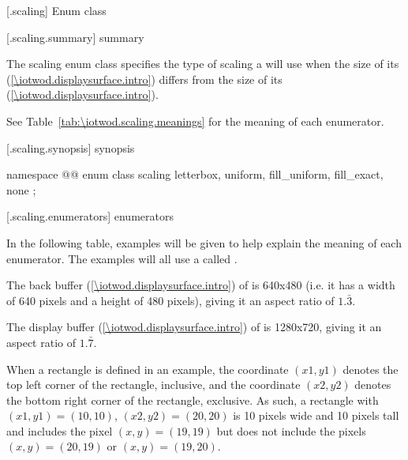  [\iotwod.scaling] {Enum class }

 [\iotwod.scaling.summary] { summary}

\pnum
The scaling enum class specifies the type of scaling a  
will use when the size of its  (\ref{\iotwod.displaysurface.intro}) differs from the size of its  (\ref{\iotwod.displaysurface.intro}).

\pnum
See Table~\ref{tab:\iotwod.scaling.meanings} for the meaning of each  enumerator.

 [\iotwod.scaling.synopsis] { synopsis}

\begin{codeblock}
namespace @\fullnamespace{}@ {
  enum class scaling {
    letterbox,
    uniform,
    fill_uniform,
    fill_exact,
    none
  };
}
\end{codeblock}

 [\iotwod.scaling.enumerators] { enumerators}

\pnum
\begin{note}
In the following table, examples will be given to help explain the meaning of each enumerator. The examples will all use a  called .

The back buffer (\ref{\iotwod.displaysurface.intro}) of  is 640x480 (i.e. it has a width of 640 pixels and a height of 480 pixels), giving it an aspect ratio of $1.\bar{3}$.

The display buffer (\ref{\iotwod.displaysurface.intro}) of  is 1280x720, giving it an aspect ratio of $1.\bar{7}$.

When a rectangle is defined in an example, the coordinate $(x1,y1)$ denotes the top left corner of the rectangle, inclusive, and the coordinate $(x2,y2)$ denotes the bottom right corner of the rectangle, exclusive. As such, a rectangle with $(x1,y1) = (10,10)$, $(x2,y2) = (20, 20)$ is 10 pixels wide and 10 pixels tall and includes the pixel $(x,y) = (19,19)$ but does not include the pixels $(x,y) = (20,19)$ or $(x,y) = (19,20)$.
\end{note}

